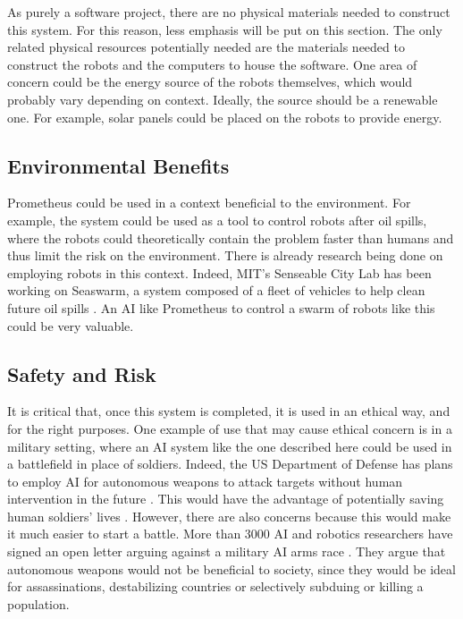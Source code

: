 \documentclass[titlepage,11pt]{article}
\begin{document}
As purely a software project, there are no physical materials needed to construct this system. For this reason, less emphasis will be put on this section. The only related physical resources potentially needed are the materials needed to construct the robots and the computers to house the software. One area of concern could be the energy source of the robots themselves, which would probably vary depending on context. Ideally, the source should be a renewable one. For example, solar panels could be placed on the robots to provide energy.

\subsection{Environmental Benefits}

Prometheus could be used in a context beneficial to the environment. For example, the system could be used as a tool to control robots after oil spills, where the robots could theoretically contain the problem faster than humans and thus limit the risk on the environment. There is already research being done on employing robots in this context. Indeed, MIT's Senseable City Lab has been working on Seaswarm, a system composed of a fleet of vehicles to help clean future oil spills \cite{seaswarm}. An AI like Prometheus to control a swarm of robots like this could be very valuable. 

\subsection{Safety and Risk}

It is critical that, once this system is completed, it is used in an ethical way, and for the right purposes. One example of use that may cause ethical concern is in a military setting, where an AI system like the one described here could be used in a battlefield in place of soldiers. Indeed, the US Department of Defense has plans to employ AI for autonomous weapons to attack targets without human intervention in the future \cite{military}. This would have the advantage of potentially saving human soldiers' lives \cite{define_military_ai}. However, there are also concerns because this would make it much easier to start a battle. More than 3000 AI and robotics researchers have signed an open letter arguing against a military AI arms race \cite{openletter}. They argue that autonomous weapons would not be beneficial to society, since they would be ideal for assassinations, destabilizing countries or selectively subduing or killing a population.
\end{document}
